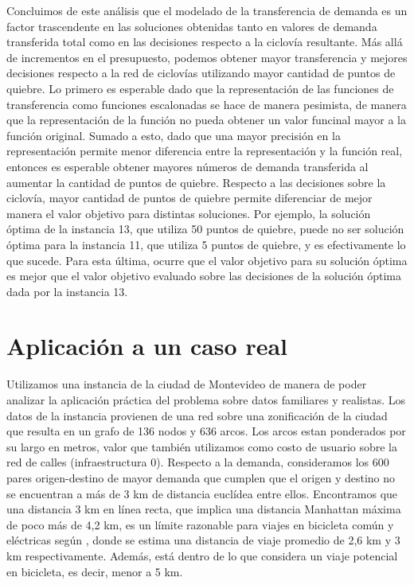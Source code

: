 Concluimos de este análisis que el modelado de la transferencia de demanda es un factor trascendente en las soluciones obtenidas tanto en valores de demanda transferida total como en las decisiones respecto a la ciclovía resultante. Más allá de incrementos en el presupuesto, podemos obtener mayor transferencia y mejores decisiones respecto a la red de ciclovías utilizando mayor cantidad de puntos de quiebre. Lo primero es esperable dado que la representación de las funciones de transferencia como funciones escalonadas se hace de manera pesimista, de manera que la representación de la función no pueda obtener un valor funcinal mayor a la función original. Sumado a esto, dado que una mayor precisión en la representación permite menor diferencia entre la representación y la función real, entonces es esperable obtener mayores números de demanda transferida al aumentar la cantidad de puntos de quiebre. Respecto a las decisiones sobre la ciclovía, mayor cantidad de puntos de quiebre permite diferenciar de mejor manera el valor objetivo para distintas soluciones. Por ejemplo, la solución óptima de la instancia 13, que utiliza 50 puntos de quiebre, puede no ser solución óptima para la instancia 11, que utiliza 5 puntos de quiebre, y es efectivamente lo que sucede. Para esta última, ocurre que el valor objetivo para su solución óptima es mejor que el valor objetivo evaluado sobre las decisiones de la solución óptima dada por la instancia 13.

\FloatBarrier
\section{Aplicación a un caso real}

Utilizamos una instancia de la ciudad de Montevideo de manera de poder analizar la aplicación práctica del problema sobre datos familiares y realistas. Los datos de la instancia provienen de una red sobre una zonificación de la ciudad que resulta en un grafo de 136 nodos y 636 arcos. Los arcos estan ponderados por su largo en metros, valor que también utilizamos como costo de usuario sobre la red de calles (infraestructura 0). Respecto a la demanda, consideramos los 600 pares origen-destino de mayor demanda que cumplen que el origen y destino no se encuentran a más de 3 km de distancia euclídea entre ellos. Encontramos que una distancia 3 km en línea recta, que implica una distancia Manhattan máxima de poco más de 4,2 km, es un límite razonable para viajes en bicicleta común y eléctricas según \textcite{anette2018}, donde se estima una distancia de viaje promedio de 2,6 km y 3 km respectivamente. Además, está dentro de lo que \textcite{shwe2014} considera un viaje potencial en bicicleta, es decir, menor a 5 km.


